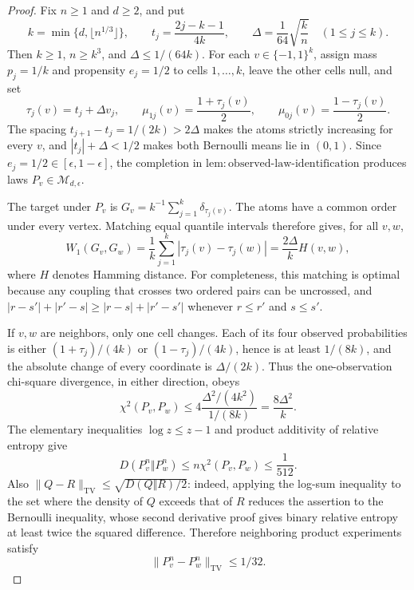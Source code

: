 \documentclass{article}
\begin{document}
\begin{proof}
Fix \(n\geq1\) and \(d\geq2\), and put
\[
k=\min\{d,\lfloor n^{1/3}\rfloor\},\qquad
t_j=\frac{2j-k-1}{4k},\qquad
\Delta=\frac1{64}\sqrt{\frac{k}{n}}
\quad(1\leq j\leq k).
\]
Then \(k\geq1\), \(n\geq k^3\), and \(\Delta\leq1/(64k)\).  For each \(v\in\{-1,1\}^k\), assign mass \(p_j=1/k\) and propensity \(e_j=1/2\) to cells \(1,\ldots,k\), leave the other cells null, and set
\[
\tau_j(v)=t_j+\Delta v_j,\qquad
\mu_{1j}(v)=\frac{1+\tau_j(v)}2,\qquad
\mu_{0j}(v)=\frac{1-\tau_j(v)}2.
\]
The spacing \(t_{j+1}-t_j=1/(2k)>2\Delta\) makes the atoms strictly increasing for every \(v\), and \(|t_j|+\Delta<1/2\) makes both Bernoulli means lie in \((0,1)\).  Since \(e_j=1/2\in[\epsilon,1-\epsilon]\), the completion in \(\mathrm{lem:observed\mbox{-}law\mbox{-}identification}\) produces laws \(P_v\in\mathcal M_{d,\epsilon}\).

The target under \(P_v\) is \(G_v=k^{-1}\sum_{j=1}^k\delta_{\tau_j(v)}\).  The atoms have a common order under every vertex.  Matching equal quantile intervals therefore gives, for all \(v,w\),
\[
W_1(G_v,G_w)=\frac1k\sum_{j=1}^k|\tau_j(v)-\tau_j(w)|
=\frac{2\Delta}{k}H(v,w),
\]
where \(H\) denotes Hamming distance.  For completeness, this matching is optimal because any coupling that crosses two ordered pairs can be uncrossed, and
\(|r-s'|+|r'-s|\geq|r-s|+|r'-s'|\) whenever \(r\leq r'\) and \(s\leq s'\).

If \(v,w\) are neighbors, only one cell changes.  Each of its four observed probabilities is either \((1+\tau_j)/(4k)\) or \((1-\tau_j)/(4k)\), hence is at least \(1/(8k)\), and the absolute change of every coordinate is \(\Delta/(2k)\).  Thus the one-observation chi-square divergence, in either direction, obeys
\[
\chi^2(P_v,P_w)
\leq4\frac{\Delta^2/(4k^2)}{1/(8k)}
=\frac{8\Delta^2}{k}.
\]
The elementary inequalities \(\log z\leq z-1\) and product additivity of relative entropy give
\[
D(P_v^n\Vert P_w^n)\leq n\chi^2(P_v,P_w)
\leq\frac1{512}.
\]
Also \(\lVert Q-R\rVert_{\mathrm{TV}}\leq\sqrt{D(Q\Vert R)/2}\): indeed, applying the log-sum inequality to the set where the density of \(Q\) exceeds that of \(R\) reduces the assertion to the Bernoulli inequality, whose second derivative proof gives binary relative entropy at least twice the squared difference.  Therefore neighboring product experiments satisfy
\[
\lVert P_v^n-P_w^n\rVert_{\mathrm{TV}}\leq1/32.
\]


\end{proof}
\end{document}
